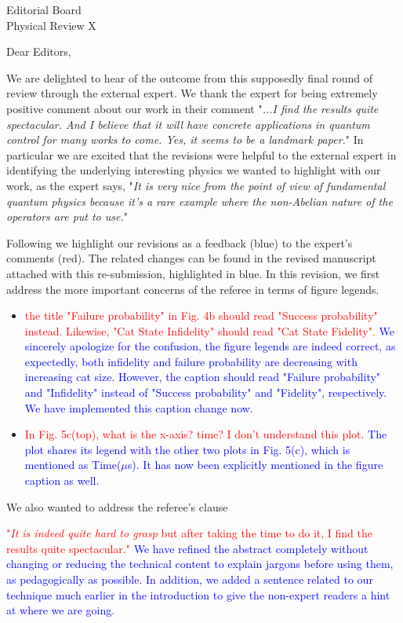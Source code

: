 \documentclass[11pt, letterpaper]{article}
\begin{document}
\noindent
Editorial Board\\
Physical Review X\\

\vspace{12pt}

\noindent
Dear Editors,

We are delighted to hear of the outcome from this supposedly final round of review through the external expert. We thank the expert for being extremely positive comment about our work in their comment "\textit{...I find the results quite spectacular. And I believe that it will have concrete applications in quantum control for many works to come. Yes, it seems to be a landmark paper.}" In particular we are excited that the revisions were helpful to the external expert in identifying the underlying interesting physics we wanted to highlight with our work, as the expert says, "\textit{It is very nice from the point of view of fundamental quantum physics because it's a rare example where the non-Abelian nature of the operators are put to use.}" 

Following we highlight our revisions as a feedback (blue) to the expert's comments (red). The related changes can be found in the revised manuscript attached with this re-submission, highlighted in blue.
In this revision, we first address the more important concerns of the referee in terms of figure legends.
\begin{itemize}
    \item \textcolor{red}{the title "Failure probability" in Fig. 4b should read "Success probability" instead. Likewise, "Cat State Infidelity" should read "Cat State Fidelity".} \textcolor{blue}{We sincerely apologize for the confusion, the figure legends are indeed correct, as expectedly, both infidelity and failure probability are decreasing with increasing cat size. However, the caption should read "Failure probability" and "Infidelity" instead of "Success probability" and "Fidelity", respectively. We have implemented this caption change now.}
    \item \textcolor{red}{In Fig. 5c(top), what is the x-axis? time? I don't understand this plot.} \textcolor{blue}{The plot shares its legend with the other two plots in Fig. 5(c), which is mentioned as Time($\mu$s). It has now been explicitly mentioned in the figure caption as well.}
\end{itemize}
We also wanted to address the referee's clause 

\textcolor{red}{"\textit{It is indeed quite hard to grasp} but after taking the time to do it, I find the results quite spectacular."} \textcolor{blue}{We have refined the abstract completely without changing or reducing the technical content to explain jargons before using them, as pedagogically as possible. In addition, we added a sentence related to our technique much earlier in the introduction to give the non-expert readers a hint at where we are going.}
\end{document}
